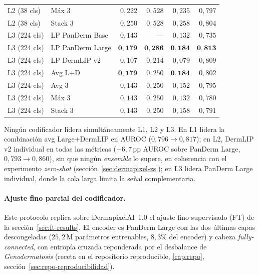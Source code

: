 \begin{table}[htbp]
\begin{tabular}{llrrrr}
L2 (38 cls)  & Máx 3                       & $0{,}222$          & $0{,}528$          & $0{,}235$          & $0{,}797$ \\
L2 (38 cls)  & Stack 3                     & $0{,}250$          & $0{,}528$          & $0{,}258$          & $0{,}804$ \\
\hline
L3 (224 cls) & LP PanDerm Base             & $0{,}143$          & ---                & $0{,}132$          & $0{,}735$ \\
L3 (224 cls) & LP PanDerm Large            & $\mathbf{0{,}179}$ & $\mathbf{0{,}286}$ & $\mathbf{0{,}184}$ & $\mathbf{0{,}813}$ \\
L3 (224 cls) & LP DermLIP v2               & $0{,}107$          & $0{,}214$          & $0{,}079$          & $0{,}809$ \\
L3 (224 cls) & Avg L$+$D                   & $\mathbf{0{,}179}$ & $0{,}250$          & $\mathbf{0{,}184}$ & $0{,}802$ \\
L3 (224 cls) & Avg 3                       & $0{,}143$          & $0{,}250$          & $0{,}152$          & $0{,}795$ \\
L3 (224 cls) & Máx 3                       & $0{,}143$          & $0{,}250$          & $0{,}132$          & $0{,}780$ \\
L3 (224 cls) & Stack 3                     & $0{,}143$          & $0{,}250$          & $0{,}158$          & $0{,}791$ \\
\hline
\end{tabular}
\end{table}

Ningún codificador lidera simultáneamente L1, L2 y L3. En L1 lidera la
combinación avg Large$+$DermLIP en AUROC ($0{,}796 \to 0{,}817$); en
L2, DermLIP v2 individual en todas las métricas ($+6{,}7$\,pp AUROC
sobre PanDerm Large, $0{,}793 \to 0{,}860$), sin que ningún
\emph{ensemble} lo supere, en coherencia con el experimento
\emph{zero-shot} (sección~\ref{sec:dermapixel-zs}); en L3 lidera
PanDerm Large individual, donde la cola larga limita la señal
complementaria.


\paragraph{Ajuste fino parcial del codificador.}
\label{sec:dermapixel-ft}
\label{sec:dermapixel-ft-l1}
Este protocolo replica sobre DermapixelAI~1.0 el ajuste fino
supervisado (FT) de la sección~\ref{sec:ft-results}. El encoder es
PanDerm Large con las dos últimas capas descongeladas ($25{,}2$\,M
parámetros entrenables, $8{,}3\%$ del encoder) y cabeza
\emph{fully-connected}, con entropía cruzada reponderada por el
desbalance de \emph{Genodermatosis} (receta en el repositorio
reproducible, \ref{cap:repo}, sección~\ref{sec:repo-reproducibilidad}).

